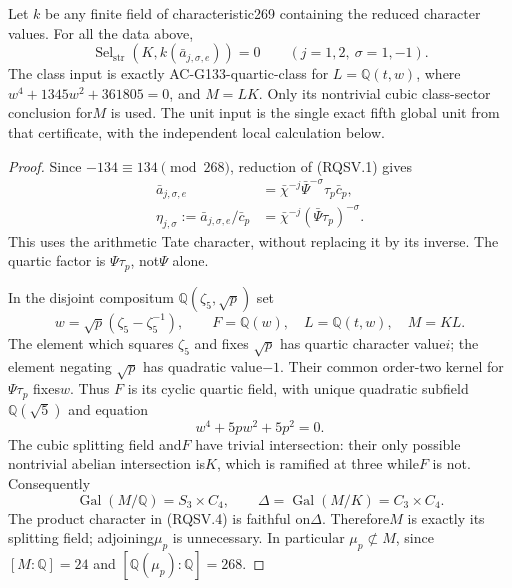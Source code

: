 \begin{theorem}
\label{thm:ACG134residual}
Let $k$ be any finite field of characteristic269 containing the
reduced character values.  For all the data above,
\[
          \operatorname{Sel}_{\mathrm{str}}
               (K,k(\bar a_{j,\sigma,e}))=0
              \qquad (j=1,2,\ \sigma=1,-1).
 \tag{RQSV.3}
\]
The class input is exactly AC-G133-quartic-class for
$L=\mathbb Q(t,w)$, where
$w^4+1345w^2+361805=0$, and $M=LK$.
Only its nontrivial cubic class-sector conclusion for$M$ is used.
The unit input is the single exact fifth global unit from that
certificate, with the independent local calculation below.
\end{theorem}

\begin{proof}
Since $-134\equiv134\pmod{268}$, reduction of (RQSV.1) gives
\[
 \begin{split}
 \bar a_{j,\sigma,e}
      &=\bar\chi^{-j}\bar\Psi^{-\sigma}\tau_p\bar c_p,\\
 \eta_{j,\sigma}:=\bar a_{j,\sigma,e}/\bar c_p
      &=\bar\chi^{-j}(\bar\Psi\tau_p)^{-\sigma}.
 \end{split}
 \tag{RQSV.4}
\]
This uses the arithmetic Tate character, without replacing it by
its inverse.  The quartic factor is $\Psi\tau_p$, not$\Psi$ alone.

In the disjoint compositum $\mathbb Q(\zeta_5,\sqrt p)$ set
\[
       w=\sqrt p(\zeta_5-\zeta_5^{-1}),\qquad
       F=\mathbb Q(w),\quad L=\mathbb Q(t,w),\quad M=KL.
 \tag{RQSV.5}
\]
The element which squares $\zeta_5$ and fixes $\sqrt p$ has
quartic character value$i$; the element negating $\sqrt p$
has quadratic value$-1$.  Their common order-two kernel for
$\Psi\tau_p$ fixes$w$.  Thus $F$ is its cyclic quartic field,
with unique quadratic subfield$\mathbb Q(\sqrt5)$ and equation
\[
                        w^4+5pw^2+5p^2=0.
 \tag{RQSV.6}
\]
The cubic splitting field and$F$ have trivial intersection:
their only possible nontrivial abelian intersection is$K$,
which is ramified at three while$F$ is not.
Consequently
\[
        \operatorname{Gal}(M/\mathbb Q)=S_3\times C_4,
        \qquad \Delta=\operatorname{Gal}(M/K)=C_3\times C_4.
 \tag{RQSV.7}
\]
The product character in (RQSV.4) is faithful on$\Delta$.
Therefore$M$ is exactly its splitting field; adjoining$\mu_p$
is unnecessary.  In particular $\mu_p\not\subset M$, since
$[M:\mathbb Q]=24$ and $[\mathbb Q(\mu_p):\mathbb Q]=268$.


\end{proof}
